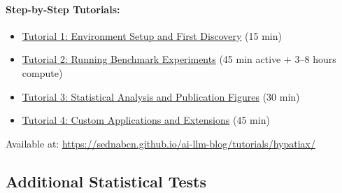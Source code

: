 \documentclass[twoside,11pt]{article}
\begin{document}
\paragraph{Step-by-Step Tutorials:}
\begin{itemize}
\item \href{https://sednabcn.github.io/ai-llm-blog/tutorials/hypatiax/setup/}{Tutorial 1: Environment Setup and First Discovery} (15 min)
\item \href{https://sednabcn.github.io/ai-llm-blog/tutorials/hypatiax/experiments/}{Tutorial 2: Running Benchmark Experiments} (45 min active + 3--8 hours compute)
\item \href{https://sednabcn.github.io/ai-llm-blog/tutorials/hypatiax/analysis/}{Tutorial 3: Statistical Analysis and Publication Figures} (30 min)
\item \href{https://sednabcn.github.io/ai-llm-blog/tutorials/hypatiax/extensions/}{Tutorial 4: Custom Applications and Extensions} (45 min)
\end{itemize}
Available at: \url{https://sednabcn.github.io/ai-llm-blog/tutorials/hypatiax/}


\subsection{Additional Statistical Tests}
\end{document}
